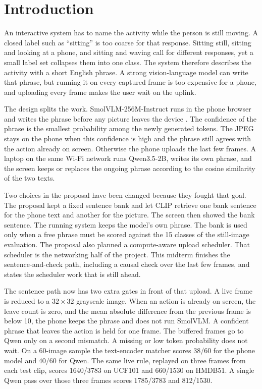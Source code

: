 \section{Introduction}

An interactive system has to name the activity while the person is still
moving. A closed label such as ``sitting'' is too coarse for that response.
Sitting still, sitting and looking at a phone, and sitting and waving call
for different responses, yet a small label set collapses them into one
class. The system therefore describes the activity with a short English
phrase. A strong vision-language model can write that phrase, but running
it on every captured frame is too expensive for a phone, and uploading
every frame makes the user wait on the uplink.

The design splits the work. SmolVLM-256M-Instruct runs in the phone browser
and writes the phrase before any picture leaves the device
\cite{marafioti2025smolvlm}. The confidence of the phrase is the smallest
probability among the newly generated tokens. The JPEG stays on the phone
when this confidence is high and the phrase still agrees with the action
already on screen. Otherwise the phone uploads the last few frames. A
laptop on the same Wi-Fi network runs Qwen3.5-2B, writes its own phrase,
and the screen keeps or replaces the ongoing phrase according to the cosine
similarity of the two texts.

Two choices in the proposal have been changed because they fought that
goal. The proposal kept a fixed sentence bank and let CLIP retrieve one
bank sentence for the phone text and another for the picture. The screen
then showed the bank sentence. The running system keeps the model's own
phrase. The bank is used only when a free phrase must be scored against the
15 classes of the still-image evaluation. The proposal also planned a
compute-aware upload scheduler. That scheduler is the networking half of
the project. This midterm finishes the sentence-and-check path, including a
causal check over the last few frames, and states the scheduler work that
is still ahead.

The sentence path now has two extra gates in front of that upload. A live
frame is reduced to a \(32\times 32\) grayscale image. When an action is
already on screen, the leave count is zero, and the mean absolute
difference from the previous frame is below 10, the phone keeps the phrase
and does not run SmolVLM. A confident phrase that leaves the action is
held for one frame. The buffered frames go to Qwen only on a second
mismatch. A missing or low token probability does not wait. On a 60-image
sample the text-encoder matcher scores 38/60 for the phone model and 40/60
for Qwen. The same live rule, replayed on three frames from each test
clip, scores 1640/3783 on UCF101 and 660/1530 on HMDB51. A single Qwen
pass over those three frames scores 1785/3783 and 812/1530.

